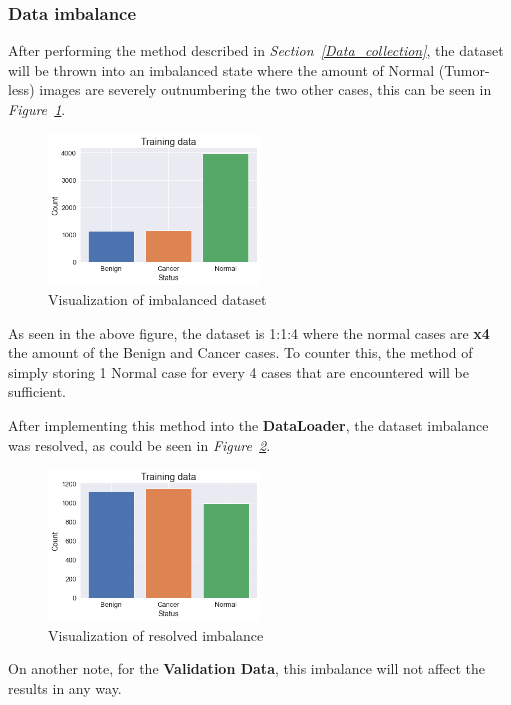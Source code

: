 \documentclass[12pt]{extarticle}
\begin{document}
	\subsubsection{Data imbalance}\label{imbalance}
	After performing the method described in \emph{Section~\ref{Data_collection}}, the dataset will be thrown into an imbalanced state where the amount of Normal (Tumor-less) images are severely outnumbering the two other cases, this can be seen in \emph{Figure~\ref{fig:imbalance}}.
	\begin{figure}[h]
		\centering
		\includegraphics[width=0.5\textwidth]{pics/Figures/Train_imbalance.png}
		\caption{\small{Visualization of imbalanced dataset}}
		\label{fig:imbalance}
	\end{figure}
	
	As seen in the above figure, the dataset is 1:1:4 where the normal cases are \textbf{x4} the amount of the Benign and Cancer cases.
	To counter this, the method of simply storing 1 Normal case for every 4 cases that are encountered will be sufficient. 

	After implementing this method into the \textbf{DataLoader}, the dataset imbalance was resolved, as could be seen in \emph{Figure~\ref{fig:balance}}.
	\begin{figure}[h]
		\centering
		\includegraphics[width=0.5\textwidth]{pics/Figures/Train_balance.png}
		\caption{\small{Visualization of resolved imbalance}}
		\label{fig:balance}
	\end{figure}
	On another note, for the \textbf{Validation Data}, this imbalance will not affect the results in any way.
	
\end{document}

